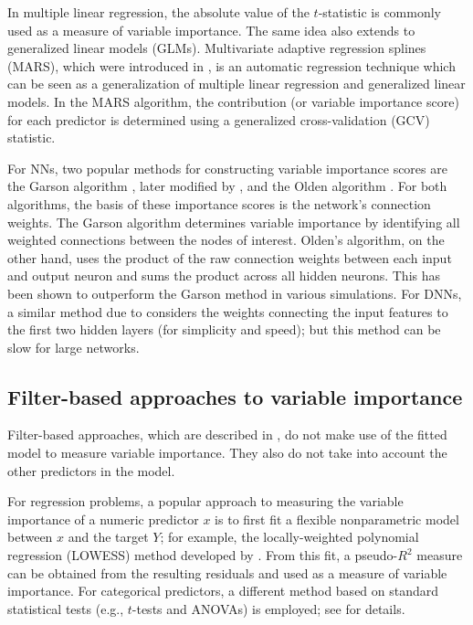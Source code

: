 \documentclass[12pt]{article}
\begin{document}
In multiple linear regression, the absolute value of the $t$-statistic is commonly used as a measure of variable importance. The same idea also extends to generalized linear models (GLMs). Multivariate adaptive regression splines (MARS), which were introduced in \citet{friedman-1991-mars}, is an automatic regression technique which can be seen as a generalization of multiple linear regression and generalized linear models. In the MARS algorithm, the contribution (or variable importance score) for each predictor is determined using a generalized cross-validation (GCV) statistic.

For NNs, two popular methods for constructing variable importance scores are the Garson algorithm \citep{interpreting-garson-1991}, later modified by \citet{back-goh-1995}, and the Olden algorithm \citep{accurate-olden-2004}. For both algorithms, the basis of these importance scores is the network's connection weights. The Garson algorithm determines variable importance by identifying all weighted connections between the nodes of interest. Olden's algorithm, on the other hand, uses the product of the raw connection weights between each input and output neuron and sums the product across all hidden neurons. This has been shown to outperform the Garson method in various simulations. For DNNs, a similar method due to \citet{data-gedeon-1997} considers the weights connecting the input features to the first two hidden layers (for simplicity and speed); but this method can be slow for large networks.


\subsection{Filter-based approaches to variable importance}

Filter-based approaches, which are described in \citet[chap. 18]{applied-kuhn-2013}, do not make use of the fitted model to measure variable importance. They also do not take into account the other predictors in the model.

For regression problems, a popular approach to measuring the variable importance of a numeric predictor $x$ is to first fit a flexible nonparametric model between $x$ and the target $Y$; for example, the locally-weighted polynomial regression (LOWESS) method developed by \citet{robust-cleveland-1979}. From this fit, a pseudo-$R^2$ measure can be obtained from the resulting residuals and used as a measure of variable importance. For categorical predictors, a different method based on standard statistical tests (e.g., $t$-tests and ANOVAs) is employed; see \citet[chap. 18]{applied-kuhn-2013} for details.
\end{document}

